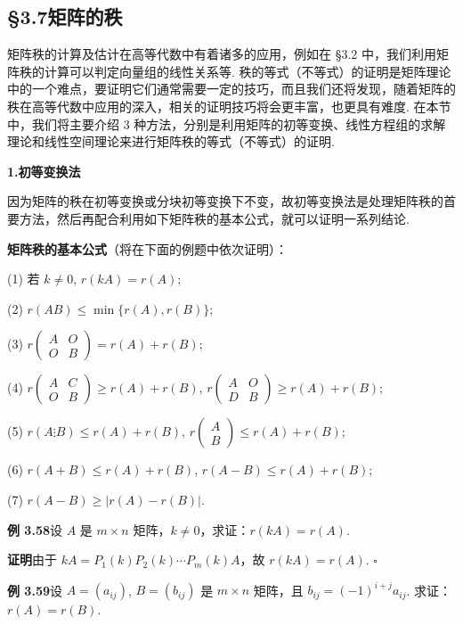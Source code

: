 \documentclass[UTF8,12pt,a4paper,fontset=fandol]{ctexart}
\begin{document}
\subsection*{§3.7\quad 矩阵的秩}

矩阵秩的计算及估计在高等代数中有着诸多的应用，例如在 §3.2 中，我们利用矩阵秩的计算可以判定向量组的线性关系等. 秩的等式（不等式）的证明是矩阵理论中的一个难点，要证明它们通常需要一定的技巧，而且我们还将发现，随着矩阵的秩在高等代数中应用的深入，相关的证明技巧将会更丰富，也更具有难度. 在本节中，我们将主要介绍 3 种方法，分别是利用矩阵的初等变换、线性方程组的求解理论和线性空间理论来进行矩阵秩的等式（不等式）的证明.

\noindent\textbf{1.\quad 初等变换法}

因为矩阵的秩在初等变换或分块初等变换下不变，故初等变换法是处理矩阵秩的首要方法，然后再配合利用如下矩阵秩的基本公式，就可以证明一系列结论.

\noindent\textbf{矩阵秩的基本公式}（将在下面的例题中依次证明）：

(1) 若 $k\ne 0$, $r(kA)=r(A)$;

(2) $r(AB)\le \min\{r(A),r(B)\}$;

(3) $r\begin{pmatrix}A&O\\O&B\end{pmatrix}=r(A)+r(B)$;

(4) $r\begin{pmatrix}A&C\\O&B\end{pmatrix}\ge r(A)+r(B)$, $r\begin{pmatrix}A&O\\D&B\end{pmatrix}\ge r(A)+r(B)$;

(5) $r(A\vdots B)\le r(A)+r(B)$, $r\begin{pmatrix}A\\B\end{pmatrix}\le r(A)+r(B)$;

(6) $r(A+B)\le r(A)+r(B)$, $r(A-B)\le r(A)+r(B)$;

(7) $r(A-B)\ge |r(A)-r(B)|$.

\noindent\textbf{例 3.58}\quad 设 $A$ 是 $m\times n$ 矩阵，$k\ne 0$，求证：$r(kA)=r(A)$.

\noindent\textbf{证明}\quad 由于 $kA=P_1(k)P_2(k)\cdots P_m(k)A$，故 $r(kA)=r(A)$. $\square$

\noindent\textbf{例 3.59}\quad 设 $A=(a_{ij})$, $B=(b_{ij})$ 是 $m\times n$ 矩阵，且 $b_{ij}=(-1)^{i+j}a_{ij}$. 求证：$r(A)=r(B)$.
\end{document}
